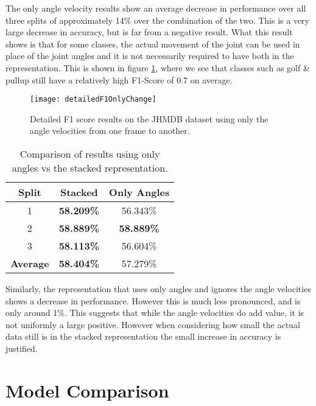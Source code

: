 The only angle velocity results show an average decrease in performance over all three splits of approximately 14\% over the combination of the two. This is a very large decrease in accuracy, but is far from a negative result. What this result shows is that for some classes, the actual movement of the joint can be used in place of the joint angles and it is not necessarily required to have both in the representation. This is shown in figure \ref{fig:detailed-f1-only-change}, where we see that classes such as golf \& pullup still have a relatively high F1-Score of 0.7 on average.

\begin{figure}[ht]
	\texttt{[image: detailedF1OnlyChange]}
	\centering
	\caption{Detailed F1 score results on the JHMDB dataset using only the angle velocities from one frame to another.}
	\label{fig:detailed-f1-only-change}
\end{figure}

\begin{table}[ht]
	\centering
	\begin{tabular}{||c c c||} 
		\hline
		\textbf{Split} & \textbf{Stacked} & \textbf{Only Angles} \\ [0.5ex] 
		\hline\hline
		1 & \textbf{58.209\%} & 56.343\% \\ 
		\hline
		2 & \textbf{58.889\%} & \textbf{58.889\%} \\
		\hline
		3 & \textbf{58.113\%} & 56.604\% \\
		\hline
		\hline
		\textbf{Average} & \textbf{58.404\%} & 57.279\% \\
		\hline
	\end{tabular}
	\caption{Comparison of results using only angles vs the stacked representation.}
	\label{tab:acc-results-v-angle}
\end{table}

Similarly, the representation that uses only angles and ignores the angle velocities shows a decrease in performance. However this is much less pronounced, and is only around 1\%. This suggests that while the angle velocities do add value, it is not uniformly a large positive. However when considering how small the actual data still is in the stacked representation the small increase in accuracy is justified.

\section{Model Comparison}